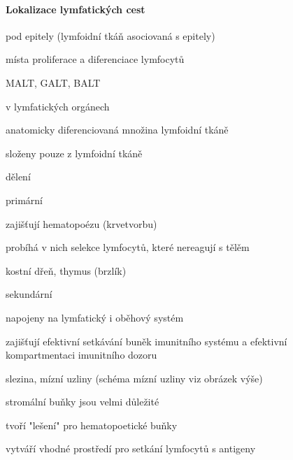 \documentclass[DIV=8]{scrreprt}
\begin{document}
\paragraph{Lokalizace lymfatických cest}
\begin{myItemize}[nosep]
    \item pod epitely (lymfoidní tkáň asociovaná s epitely)
\begin{myItemize}[nosep]
    \item místa proliferace a diferenciace lymfocytů
    \item MALT, GALT, BALT
\end{myItemize}

    \item v lymfatických orgánech
\begin{myItemize}[nosep]
    \item anatomicky diferenciovaná množina lymfoidní tkáně
    \item složeny pouze z lymfoidní tkáně
    \item dělení
\begin{myItemize}[nosep]
    \item primární
\begin{myItemize}[nosep]
    \item zajišťují hematopoézu (krvetvorbu)
    \item probíhá v nich selekce lymfocytů, které nereagují s tělěm
    \item kostní dřeň, thymus (brzlík)
\end{myItemize}

    \item sekundární
\begin{myItemize}[nosep]
    \item napojeny na lymfatický i oběhový systém
    \item zajišťují efektivní setkávání buněk imunitního systému a efektivní kompartmentaci imunitního dozoru
    \item slezina, mízní uzliny (schéma mízní uzliny viz obrázek výše)
\begin{myItemize}[nosep]
    \item stromální buňky  jsou velmi důležité
    \item tvoří "lešení" pro hematopoetické buňky
    \item vytváří vhodné prostředí pro setkání lymfocytů s antigeny
\end{myItemize}

\end{myItemize}

\end{myItemize}

\end{myItemize}

\end{myItemize}
\end{document}
